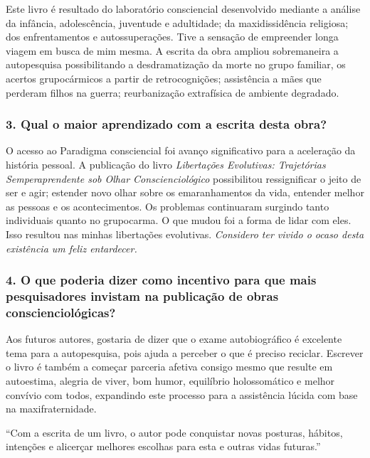 \documentclass{gescons}
\begin{document}
\begin{multicols}{2}
Este livro é resultado do laboratório consciencial desenvolvido mediante a análise da infância, adolescência, juventude e adultidade; da maxidissidência religiosa; dos enfrentamentos e autossuperações. Tive a sensação de empreender longa viagem em busca de mim mesma. A escrita da obra ampliou sobremaneira a autopesquisa possibilitando a desdramatização da morte no grupo familiar, os acertos grupocármicos a partir de retrocognições; assistência a mães que perderam filhos na guerra; reurbanização extrafísica de ambiente degradado.


\subsubsection{3. Qual o maior aprendizado com a escrita desta obra?}


O acesso ao Paradigma consciencial foi avanço significativo para a aceleração da história pessoal. A publicação do livro \emph{Libertações Evolutivas: Trajetórias Semperaprendente sob Olhar Conscienciológico} possibilitou ressignificar o jeito de ser e agir; estender novo olhar sobre os emaranhamentos da vida, entender melhor as pessoas e os acontecimentos. Os problemas continuaram surgindo tanto individuais quanto no grupocarma. O que mudou foi a forma de lidar com eles. Isso resultou nas minhas libertações evolutivas. \emph{Considero ter vivido o ocaso desta existência um feliz entardecer.}

\subsubsection{4. O que poderia dizer como incentivo para que mais pesquisadores invistam na publicação de obras conscienciológicas?}

Aos futuros autores, gostaria de dizer que o exame autobiográfico é excelente tema para a autopesquisa, pois ajuda a perceber o que é preciso reciclar. Escrever o livro é também a começar parceria afetiva consigo mesmo que resulte em autoestima, alegria de viver, bom humor, equilíbrio holos­somático e melhor convívio com todos, expandindo este processo para a assis­tência lúcida com base na maxifraternidade.


\begin{pullquote}
``Com a escrita de um livro, o autor pode conquistar novas posturas, hábitos, intenções e   alicerçar melhores escolhas para esta e outras vidas futuras.''
\end{pullquote}
    
    \end{multicols}
\end{document}
